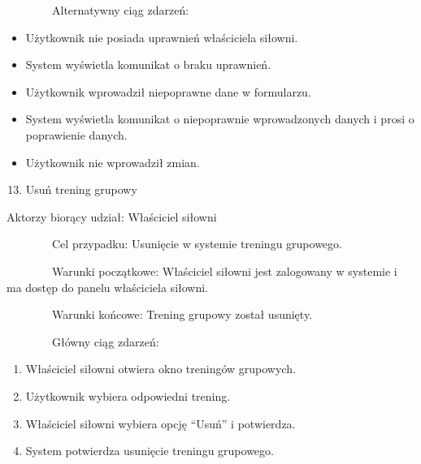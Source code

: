 {~~~~~~~~Alternatywny ciąg zdarzeń:}

\begin{itemize}
\tightlist
\item
  {Użytkownik nie posiada uprawnień właściciela siłowni.}
\end{itemize}

\begin{itemize}
\tightlist
\item
  {System wyświetla komunikat o braku uprawnień.}
\end{itemize}

\begin{itemize}
\tightlist
\item
  {Użytkownik wprowadził niepoprawne dane w formularzu.}
\end{itemize}

\begin{itemize}
\tightlist
\item
  {System wyświetla komunikat o niepoprawnie wprowadzonych danych i
  prosi o poprawienie danych.}
\end{itemize}

\begin{itemize}
\tightlist
\item
  {Użytkownik nie wprowadził zmian.}
\end{itemize}

{\hfill\break
}

\begin{enumerate}
\setcounter{enumi}{12}
\tightlist
\item
  {Usuń trening grupowy}
\end{enumerate}

{Aktorzy biorący udział: Właściciel siłowni}

{~~~~~~~~Cel przypadku: Usunięcie w systemie treningu grupowego.}

{~~~~~~~~Warunki początkowe: Właściciel siłowni jest zalogowany w
systemie i ma dostęp do panelu właściciela siłowni.}

{~~~~~~~~Warunki końcowe: Trening grupowy został usunięty.}

{~~~~~~~~Główny ciąg zdarzeń:}

\begin{enumerate}
\tightlist
\item
  {Właściciel siłowni otwiera okno treningów grupowych.}
\item
  {Użytkownik wybiera odpowiedni trening.}
\item
  {Właściciel siłowni wybiera opcję ``Usuń'' i potwierdza.}
\item
  {System potwierdza usunięcie treningu grupowego.}
\end{enumerate}

